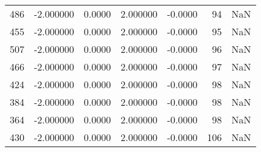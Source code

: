 \begin{tabular}{rrrrrrr}
486 &   -2.000000 &    0.0000 &    2.000000 &     -0.0000 &          94 & NaN \\
455 &   -2.000000 &    0.0000 &    2.000000 &     -0.0000 &          95 & NaN \\
507 &   -2.000000 &    0.0000 &    2.000000 &     -0.0000 &          96 & NaN \\
466 &   -2.000000 &    0.0000 &    2.000000 &     -0.0000 &          97 & NaN \\
424 &   -2.000000 &    0.0000 &    2.000000 &     -0.0000 &          98 & NaN \\
384 &   -2.000000 &    0.0000 &    2.000000 &     -0.0000 &          98 & NaN \\
364 &   -2.000000 &    0.0000 &    2.000000 &     -0.0000 &          98 & NaN \\
430 &   -2.000000 &    0.0000 &    2.000000 &     -0.0000 &         106 & NaN \\
\bottomrule
\end{tabular}
